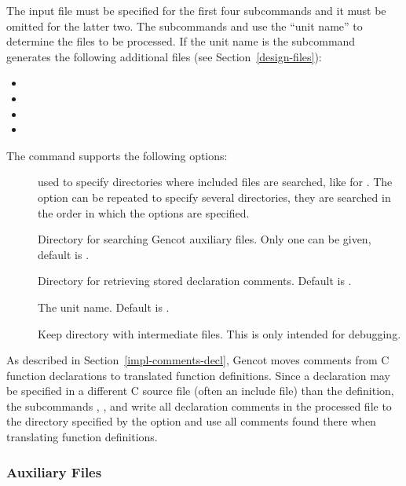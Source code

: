 The input file  must be specified for the first four subcommands and it must be omitted for the latter two.
The subcommands  and  use the ``unit name'' to determine the files to be processed.
If the unit name is  the subcommand  generates the following additional files (see Section~\ref{design-files}):
\begin{itemize}
\item {}
\item {}
\item {}
\item {}
\end{itemize}

The  command supports the following options:
\begin{description}
\item[] used to specify directories where included files are searched, like for . The 
option can be repeated to specify several directories, they are searched in the order in which the options
are specified.

\item[] Directory for searching Gencot auxiliary files. Only one can be given, default is .

\item[] Directory for retrieving stored declaration comments. Default is .

\item[] The unit name. Default is .

\item[] Keep directory with intermediate files. This is only intended for debugging.

\end{description}

As described in Section~\ref{impl-comments-decl}, Gencot moves comments from C function declarations to translated function
definitions. Since a declaration may be specified in a different C source file (often an include file) than the definition, 
the subcommands , , and  write all declaration comments in the processed file to
the directory specified by the  option and use all comments found there when translating function definitions.

\subsubsection{Auxiliary Files}

